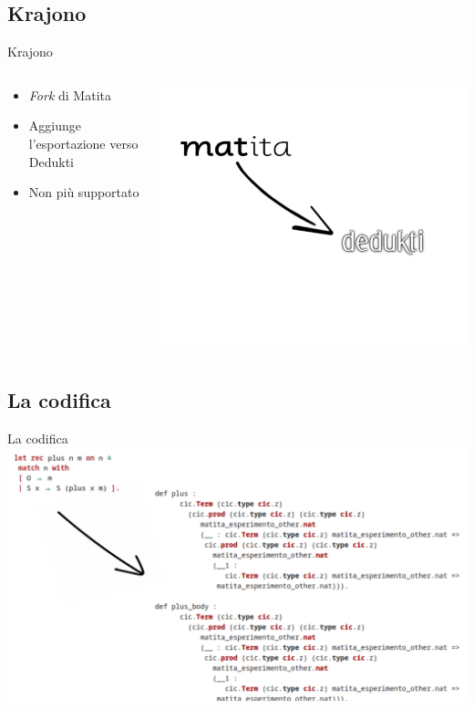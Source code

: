 \documentclass{beamer}
\begin{document}
\subsection{Krajono}
\begin{frame}{Krajono}

\begin{columns}
\begin{column}{.5\textwidth}
\begin{itemize}
  \item \textit{Fork } di Matita 
  \vspace{1.5em}
  \item Aggiunge l'esportazione verso Dedukti
  \vspace{1.5em}
  \item Non più supportato
\end{itemize}
\end{column}
\begin{column}{.5\textwidth}
\includegraphics[scale=0.40]{m2d.png}
\end{column}
\end{columns}

\end{frame}

\subsection{La codifica}
\begin{frame}{La codifica}
  \includegraphics[scale=0.40]{export.png}
\end{frame}
\end{document}
